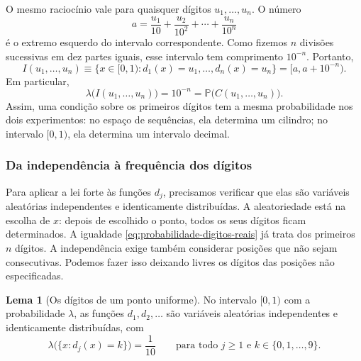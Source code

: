 \documentclass[12pt,portuguese]{article}
\theoremstyle{definition}
\newtheorem{lemma}[lemma]{Lema}
\theoremstyle{plainexercise}
\theoremstyle{starredexercise}
\theoremstyle{definition}
\begin{document}
O mesmo raciocínio vale para quaisquer dígitos $u_1,\ldots,u_n$. O número
\[
a=\frac{u_1}{10}+\frac{u_2}{10^2}+\cdots+\frac{u_n}{10^n}
\]
é o extremo esquerdo do intervalo correspondente. Como fizemos $n$ divisões
sucessivas em dez partes iguais, esse intervalo tem comprimento $10^{-n}$.
Portanto,
\begin{equation}\label{eq:intervalo-decimal}
I(u_1,\ldots,u_n)
\equiv\{x\in[0,1):d_1(x)=u_1,\ldots,d_n(x)=u_n\}
=[a,a+10^{-n}).
\end{equation}
Em particular,
\begin{equation}\label{eq:probabilidade-digitos-reais}
\lambda\bigl(I(u_1,\ldots,u_n)\bigr)=10^{-n}
=\mathbb{P}\bigl(C(u_1,\ldots,u_n)\bigr).
\end{equation}
Assim, uma condição sobre os primeiros dígitos tem a mesma probabilidade nos
dois experimentos: no espaço de sequências, ela determina um cilindro; no
intervalo $[0,1)$, ela determina um intervalo decimal.

\subsubsection{Da independência à frequência dos dígitos}

Para aplicar a lei forte às funções $d_j$, precisamos verificar que elas são
variáveis aleatórias independentes e identicamente distribuídas. A
aleatoriedade está na escolha de $x$: depois de escolhido o ponto, todos os
seus dígitos ficam determinados. A igualdade
\eqref{eq:probabilidade-digitos-reais} já trata dos primeiros $n$ dígitos.
A independência exige também considerar posições que não sejam consecutivas.
Podemos fazer isso deixando livres os dígitos das posições não especificadas.

\begin{lemma}[Os dígitos de um ponto uniforme]\label{lem:digitos-uniformes}
No intervalo $[0,1)$ com a probabilidade $\lambda$, as funções $d_1,d_2,\ldots$
são variáveis aleatórias independentes e identicamente distribuídas, com
\[
\lambda\bigl(\{x:d_j(x)=k\}\bigr)=\frac{1}{10}
\qquad\text{para todo }j\geqslant1\text{ e }k\in\{0,1,\ldots,9\}.
\]
\end{lemma}
\end{document}
